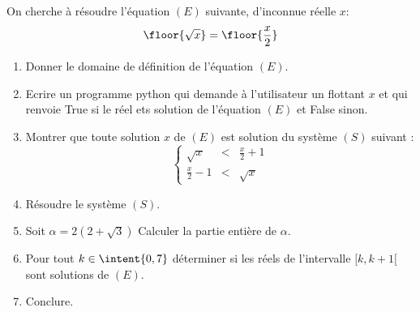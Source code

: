 



\begin{exercice}
On cherche à résoudre l'équation $(E)$ suivante, d'inconnue réelle $x$: 
$$\floor{\sqrt{x}} = \floor{ \frac{x}{2}}$$
\begin{enumerate}
\item Donner le domaine de définition de  l'équation $(E)$. 
\item Ecrire un programme python qui demande à l'utilisateur un flottant $x$ et qui renvoie True si le réel ets solution de l'équation $(E)$  et False sinon. 
\item Montrer que toute solution $x$  de $(E)$ est solution du système $(S)$ suivant : 
$$\left\{ 
\begin{array}{ccc}
\sqrt{x}&<& \frac{x}{2}+1\\
\frac{x}{2}-1&<& \sqrt{x}
\end{array}
\right. $$
\item Résoudre le système $(S)$. 
\item Soit $\alpha = 2(2+\sqrt{3})$ Calculer la partie entière de $\alpha$. 
\item Pour tout $k\in \intent{0,7} $ déterminer si les réels de l'intervalle $[k,k+1[$ sont solutions de $(E)$. 
\item Conclure.  
\end{enumerate}
\end{exercice}

